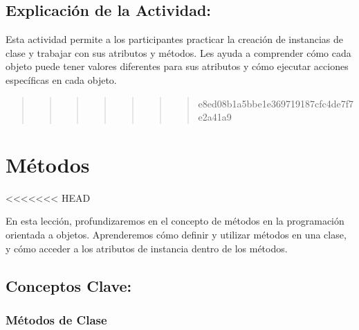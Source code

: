 \documentclass[
  a4paper,
  DIV=11,
  numbers=noendperiod,
  onepage,
  openany]{scrreprt}
\begin{document}
\hypertarget{explicaciuxf3n-de-la-actividad-49}{%
\section{Explicación de la
Actividad:}\label{explicaciuxf3n-de-la-actividad-49}}

Esta actividad permite a los participantes practicar la creación de
instancias de clase y trabajar con sus atributos y métodos. Les ayuda a
comprender cómo cada objeto puede tener valores diferentes para sus
atributos y cómo ejecutar acciones específicas en cada objeto.

\begin{quote}
\begin{quote}
\begin{quote}
\begin{quote}
\begin{quote}
\begin{quote}
\begin{quote}
e8ed08b1a5bbe1e369719187cfc4de7f7e2a41a9
\end{quote}
\end{quote}
\end{quote}
\end{quote}
\end{quote}
\end{quote}
\end{quote}

\hypertarget{muxe9todos-2}{%
\chapter{Métodos}\label{muxe9todos-2}}

\textless\textless\textless\textless\textless\textless\textless{} HEAD

En esta lección, profundizaremos en el concepto de métodos en la
programación orientada a objetos. Aprenderemos cómo definir y utilizar
métodos en una clase, y cómo acceder a los atributos de instancia dentro
de los métodos.

\hypertarget{conceptos-clave-52}{%
\section{Conceptos Clave:}\label{conceptos-clave-52}}

\hypertarget{muxe9todos-de-clase}{%
\subsection{Métodos de Clase}\label{muxe9todos-de-clase}}
\end{document}
